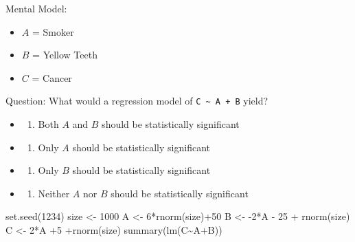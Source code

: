 \documentclass[
]{article}
\newenvironment{Shaded}{\begin{snugshade}}{\end{snugshade}}
\newcommand{\DecValTok}[1]{\textcolor[rgb]{0.00,0.00,0.81}{#1}}
\newcommand{\FunctionTok}[1]{\textcolor[rgb]{0.00,0.00,0.00}{#1}}
\newcommand{\NormalTok}[1]{#1}
\newcommand{\OtherTok}[1]{\textcolor[rgb]{0.56,0.35,0.01}{#1}}
\newcommand{\SpecialCharTok}[1]{\textcolor[rgb]{0.00,0.00,0.00}{#1}}
\providecommand{\tightlist}{%
  \setlength{\itemsep}{0pt}\setlength{\parskip}{0pt}}
\begin{document}
\hypertarget{htmlwidget-957489eae0dd679f4e25}{}
\begin{grViz}

\end{grViz}

Mental Model:

\begin{itemize}
\tightlist
\item
  \(A\) = Smoker
\item
  \(B\) = Yellow Teeth
\item
  \(C\) = Cancer
\end{itemize}

Question: What would a regression model of
\texttt{C\ \textasciitilde{}\ A\ +\ B} yield?

\begin{itemize}
\item
  \begin{enumerate}
  \def\labelenumi{\alph{enumi})}
  \tightlist
  \item
    Both \(A\) and \(B\) should be statistically significant
  \end{enumerate}
\item
  \begin{enumerate}
  \def\labelenumi{\alph{enumi})}
  \setcounter{enumi}{1}
  \tightlist
  \item
    Only \(A\) should be statistically significant
  \end{enumerate}
\item
  \begin{enumerate}
  \def\labelenumi{\alph{enumi})}
  \setcounter{enumi}{2}
  \tightlist
  \item
    Only \(B\) should be statistically significant
  \end{enumerate}
\item
  \begin{enumerate}
  \def\labelenumi{\alph{enumi})}
  \setcounter{enumi}{3}
  \tightlist
  \item
    Neither \(A\) nor \(B\) should be statistically significant
  \end{enumerate}
\end{itemize}

\begin{Shaded}
\begin{Highlighting}[]
\FunctionTok{set.seed}\NormalTok{(}\DecValTok{1234}\NormalTok{)}
\NormalTok{size }\OtherTok{\textless{}{-}} \DecValTok{1000}
\NormalTok{A }\OtherTok{\textless{}{-}} \DecValTok{6}\SpecialCharTok{*}\FunctionTok{rnorm}\NormalTok{(size)}\SpecialCharTok{+}\DecValTok{50}
\NormalTok{B }\OtherTok{\textless{}{-}} \SpecialCharTok{{-}}\DecValTok{2}\SpecialCharTok{*}\NormalTok{A }\SpecialCharTok{{-}} \DecValTok{25} \SpecialCharTok{+} \FunctionTok{rnorm}\NormalTok{(size)}
\NormalTok{C }\OtherTok{\textless{}{-}} \DecValTok{2}\SpecialCharTok{*}\NormalTok{A }\SpecialCharTok{+}\DecValTok{5} \SpecialCharTok{+}\FunctionTok{rnorm}\NormalTok{(size)}
\FunctionTok{summary}\NormalTok{(}\FunctionTok{lm}\NormalTok{(C}\SpecialCharTok{\textasciitilde{}}\NormalTok{A}\SpecialCharTok{+}\NormalTok{B))}
\end{Highlighting}
\end{Shaded}
\end{document}
